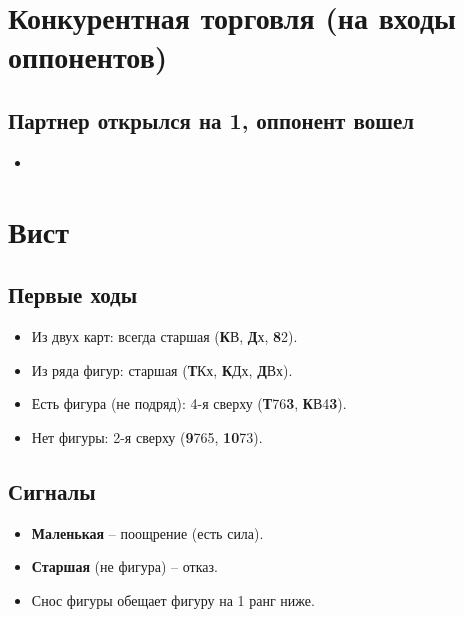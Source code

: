 \documentclass[a4paper,10pt]{article}
\begin{document}
\section{Конкурентная торговля (на входы оппонентов)}
\subsection{Партнер открылся на 1, оппонент вошел}
\begin{itemize}[label=\textcolor{sputnikRed}{\tiny\(\blacksquare\)}, noitemsep]
    \item
\end{itemize}

\section{Вист}
\subsection{Первые ходы}
\begin{itemize}[noitemsep]
    \item Из двух карт: всегда старшая (\textbf{К}В, \textbf{Д}х, \textbf{8}2).
    \item Из ряда фигур: старшая (\textbf{Т}Кх, \textbf{К}Дх, \textbf{Д}Вх).
    \item Есть фигура (не подряд): 4-я сверху (\textbf{Т}76\textbf{3}, \textbf{К}В4\textbf{3}).
    \item Нет фигуры: 2-я сверху (\textbf{9}765, \textbf{10}73).
\end{itemize}
\subsection{Сигналы}
\begin{itemize}[noitemsep]
    \item \textbf{Маленькая} – поощрение (есть сила).
    \item \textbf{Старшая} (не фигура) – отказ.
    \item Снос фигуры обещает фигуру на 1 ранг ниже.
\end{itemize}
\end{document}
